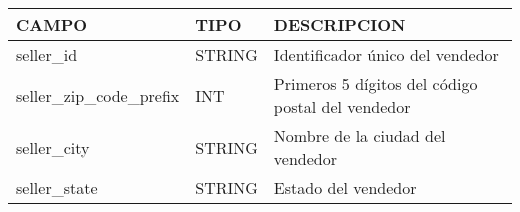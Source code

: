 \documentclass[11pt]{article}
\begin{document}
\begin{longtable}[]{@{}lll@{}}
\toprule
\begin{minipage}[b]{0.30\columnwidth}\raggedright
CAMPO\strut
\end{minipage} & \begin{minipage}[b]{0.30\columnwidth}\raggedright
TIPO\strut
\end{minipage} & \begin{minipage}[b]{0.30\columnwidth}\raggedright
DESCRIPCION\strut
\end{minipage}\tabularnewline
\midrule
\endhead
\begin{minipage}[t]{0.30\columnwidth}\raggedright
seller\_id\strut
\end{minipage} & \begin{minipage}[t]{0.30\columnwidth}\raggedright
STRING\strut
\end{minipage} & \begin{minipage}[t]{0.30\columnwidth}\raggedright
Identificador único del vendedor\strut
\end{minipage}\tabularnewline
\begin{minipage}[t]{0.30\columnwidth}\raggedright
seller\_zip\_code\_prefix\strut
\end{minipage} & \begin{minipage}[t]{0.30\columnwidth}\raggedright
INT\strut
\end{minipage} & \begin{minipage}[t]{0.30\columnwidth}\raggedright
Primeros 5 dígitos del código postal del vendedor\strut
\end{minipage}\tabularnewline
\begin{minipage}[t]{0.30\columnwidth}\raggedright
seller\_city\strut
\end{minipage} & \begin{minipage}[t]{0.30\columnwidth}\raggedright
STRING\strut
\end{minipage} & \begin{minipage}[t]{0.30\columnwidth}\raggedright
Nombre de la ciudad del vendedor\strut
\end{minipage}\tabularnewline
\begin{minipage}[t]{0.30\columnwidth}\raggedright
seller\_state\strut
\end{minipage} & \begin{minipage}[t]{0.30\columnwidth}\raggedright
STRING\strut
\end{minipage} & \begin{minipage}[t]{0.30\columnwidth}\raggedright
Estado del vendedor\strut
\end{minipage}\tabularnewline
\bottomrule
\end{longtable}
\end{document}
